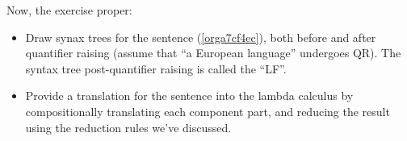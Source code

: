 \documentclass[letterpaper,parskip=half]{scrartcl}
\begin{document}
Now, the exercise proper:

\begin{itemize}
\item Draw synax trees for the sentence (\ref{orga7cf4ec}),  both before and after quantifier raising (assume that ``a European language'' undergoes QR). The syntax tree post-quantifier raising is called the ``LF''.
\item Provide a translation for the sentence into the lambda calculus by compositionally translating each component part, and reducing the result using the reduction rules we've discussed.
\end{itemize}
\end{document}
